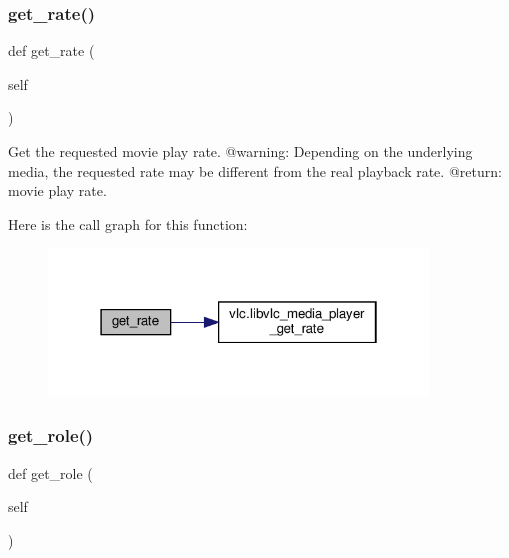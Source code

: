 \subsubsection{\texorpdfstring{get\+\_\+rate()}{get\_rate()}}
{\footnotesize\ttfamily def get\+\_\+rate (\begin{DoxyParamCaption}\item[{}]{self }\end{DoxyParamCaption})}

\begin{DoxyVerb}Get the requested movie play rate.
@warning: Depending on the underlying media, the requested rate may be
different from the real playback rate.
@return: movie play rate.
\end{DoxyVerb}
 Here is the call graph for this function\+:
\nopagebreak
\begin{figure}[H]
\begin{center}
\leavevmode
\includegraphics[width=286pt]{classvlc_1_1_media_player_ad1385ad1f285068608d077b325909d30_cgraph}
\end{center}
\end{figure}
\mbox{\label{classvlc_1_1_media_player_a6f286402bd3fdd0b7b69deeb71870300}} 
\subsubsection{\texorpdfstring{get\+\_\+role()}{get\_role()}}
{\footnotesize\ttfamily def get\+\_\+role (\begin{DoxyParamCaption}\item[{}]{self }\end{DoxyParamCaption})}

